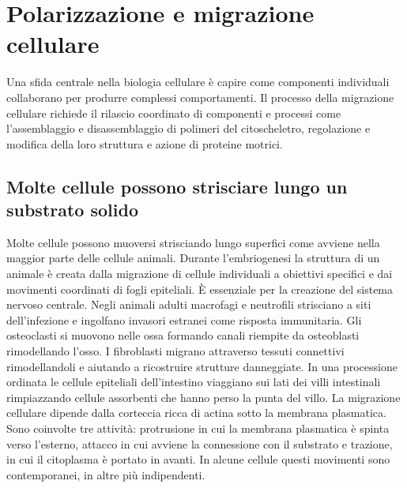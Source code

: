 \section{Polarizzazione e migrazione cellulare}
Una sfida centrale nella biologia cellulare \`e capire come componenti individuali collaborano per produrre complessi comportamenti. Il processo della migrazione cellulare richiede
il rilascio coordinato di componenti e processi come l'assemblaggio e disassemblaggio di polimeri del citoscheletro, regolazione e modifica della loro struttura e azione di proteine
motrici. 
\subsection{Molte cellule possono strisciare lungo un substrato solido}
Molte cellule possono muoversi strisciando lungo superfici come avviene nella maggior parte delle cellule animali. Durante l'embriogenesi la struttura di un animale \`e creata dalla 
migrazione di cellule individuali a obiettivi specifici e dai movimenti coordinati di fogli epiteliali. \`E essenziale per la creazione del sistema nervoso centrale. Negli animali 
adulti macrofagi e neutrofili strisciano a siti dell'infezione e ingolfano invasori estranei come risposta immunitaria. Gli osteoclasti si muovono nelle ossa formando canali 
riempite da osteoblasti rimodellando l'osso. I fibroblasti migrano attraverso tessuti connettivi rimodellandoli e aiutando a ricostruire strutture danneggiate. In una processione 
ordinata le cellule epiteliali dell'intestino viaggiano sui lati dei villi intestinali rimpiazzando cellule assorbenti che hanno perso la punta del villo. La migrazione cellulare dipende
dalla corteccia ricca di actina sotto la membrana plasmatica. Sono coinvolte tre attivit\`a: protrusione in cui la membrana plasmatica \`e spinta verso l'esterno, attacco in cui avviene
la connessione con il substrato e trazione, in cui il citoplasma \`e portato in avanti. In alcune cellule questi movimenti sono contemporanei, in altre pi\`u indipendenti. 
